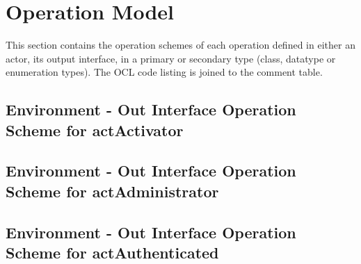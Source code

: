 \chapter{Operation Model}
\label{chap:lu.uni.lassy.excalibur.examples.icrash-OM}

This section contains the operation schemes of each operation defined in either an actor, its output interface, in a primary or secondary type (class, datatype or enumeration types). 
The \msrmessir OCL code listing is joined to the comment table.

\lstset{
float,
basicstyle=\scriptsize,
language=Messir,
breakatwhitespace=false,
tabsize=2,
breaklines=true,
numbers=left,
emptylines=1,
numbersep=5pt,
showspaces=false,
showstringspaces=false,
showtabs=false
} 



		
\section{Environment - Out Interface Operation Scheme for actActivator}
\label{OM-EM-OutInterface-OS-actActivator}


\section{Environment - Out Interface Operation Scheme for actAdministrator}
\label{OM-EM-OutInterface-OS-actAdministrator}





\section{Environment - Out Interface Operation Scheme for actAuthenticated}
\label{OM-EM-OutInterface-OS-actAuthenticated}


